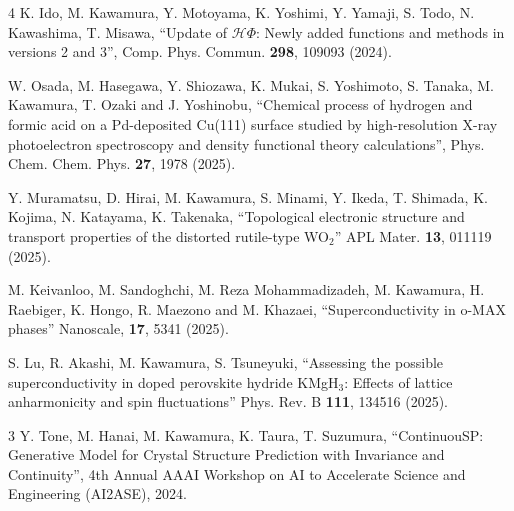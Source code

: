 \begin{雑誌論文}{4}
K. Ido, M. Kawamura, Y. Motoyama, K. Yoshimi, Y. Yamaji, S. Todo, N. Kawashima, T. Misawa, 
``Update of $\mathcal{H}\Phi$: Newly added functions and methods in versions 2 and 3'',
Comp. Phys. Commun. \textbf{298}, 109093 (2024).

W. Osada, M. Hasegawa, Y. Shiozawa, K. Mukai, S. Yoshimoto, S. Tanaka, M. Kawamura, T. Ozaki and J. Yoshinobu, 
``Chemical process of hydrogen and formic acid on a Pd-deposited Cu(111) surface studied by high-resolution X-ray photoelectron spectroscopy and density functional theory calculations'',
Phys. Chem. Chem. Phys. \textbf{27}, 1978 (2025).

Y. Muramatsu, D. Hirai, M. Kawamura, S. Minami, Y. Ikeda, T. Shimada, K. Kojima, N. Katayama, K. Takenaka, 
``Topological electronic structure and transport properties of the distorted rutile-type WO$_2$''
APL Mater. \textbf{13}, 011119 (2025).

M. Keivanloo, M. Sandoghchi, M. Reza Mohammadizadeh, M. Kawamura, H. Raebiger, K. Hongo, R. Maezono and M. Khazaei, 
``Superconductivity in o-MAX phases''
Nanoscale, \textbf{17}, 5341 (2025).

S. Lu, R. Akashi, M. Kawamura, S. Tsuneyuki, 
``Assessing the possible superconductivity in doped perovskite hydride KMgH$_3$: Effects of lattice anharmonicity and spin fluctuations''
Phys. Rev. B \textbf{111}, 134516 (2025).
\end{雑誌論文}

\begin{査読付}{3}
Y. Tone, M. Hanai, M. Kawamura, K. Taura, T. Suzumura,
``ContinuouSP: Generative Model for Crystal Structure Prediction with Invariance and Continuity'',
 4th Annual AAAI Workshop on AI to Accelerate Science and Engineering (AI2ASE), 2024.
\end{査読付}
